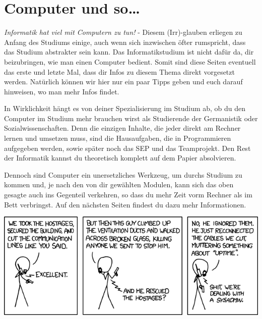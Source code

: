 \section{Computer und so\ldots}
	\begin{multicols}{2}
	\label{computer}
	\emph{Informatik hat viel mit Computern zu tun!} - Diesem (Irr)-glauben erliegen zu Anfang des Studiums einige, auch wenn sich inzwischen öfter rumspricht, dass das Studium abstrakter sein kann. Das Informatikstudium ist nicht dafür da, dir beizubringen, wie man einen Computer bedient. Somit sind diese Seiten eventuell das erste und letzte Mal,  dass dir Infos zu diesem Thema direkt vorgesetzt werden. Natürlich können wir hier nur ein paar Tipps geben und euch darauf hinweisen, wo man mehr Infos  findet.

	In Wirklichkeit hängt es von deiner Spezialisierung im Studium ab, ob  du den Computer im Studium mehr brauchen wirst als  Studierende der Germanistik oder Sozialwissenschaften. Denn die einzigen Inhalte,  die jeder direkt am Rechner lernen und umsetzen muss, sind die Hausaufgaben,  die in Programmieren aufgegeben werden, sowie später noch das SEP und das Teamprojekt. Den Rest der Informatik kannst du theoretisch komplett auf dem Papier absolvieren.

	Dennoch sind Computer ein unersetzliches Werkzeug, um durchs Studium zu kommen und, je nach den von dir gewählten Modulen, kann sich das oben gesagte auch ins Gegenteil verkehren, so dass du mehr Zeit vorm Rechner als im Bett verbringst. Auf den nächsten Seiten findest du dazu mehr Informationen.






\end{multicols}
\begin{center}
		\includegraphics[totalheight=6cm]{bilder/XKCD/devotion_to_duty}
\end{center}
